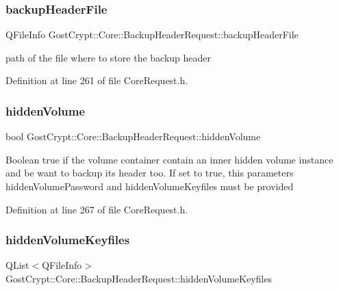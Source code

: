 \subsubsection{\texorpdfstring{backup\+Header\+File}{backupHeaderFile}}
{\footnotesize\ttfamily Q\+File\+Info Gost\+Crypt\+::\+Core\+::\+Backup\+Header\+Request\+::backup\+Header\+File}

path of the file where to store the backup header 

Definition at line 261 of file Core\+Request.\+h.

\mbox{\label{struct_gost_crypt_1_1_core_1_1_backup_header_request_a7a27003d28de62be2a7ff7e032f044e8}} 
\subsubsection{\texorpdfstring{hidden\+Volume}{hiddenVolume}}
{\footnotesize\ttfamily bool Gost\+Crypt\+::\+Core\+::\+Backup\+Header\+Request\+::hidden\+Volume}

Boolean true if the volume container contain an inner hidden volume instance and be want to backup its header too. If set to true, this parameters hidden\+Volume\+Password and hidden\+Volume\+Keyfiles must be provided 

Definition at line 267 of file Core\+Request.\+h.

\mbox{\label{struct_gost_crypt_1_1_core_1_1_backup_header_request_a775c66c416d8fe75c6c446d3b9fd29ac}} 
\subsubsection{\texorpdfstring{hidden\+Volume\+Keyfiles}{hiddenVolumeKeyfiles}}
{\footnotesize\ttfamily Q\+List$<$Q\+File\+Info$>$ Gost\+Crypt\+::\+Core\+::\+Backup\+Header\+Request\+::hidden\+Volume\+Keyfiles}

